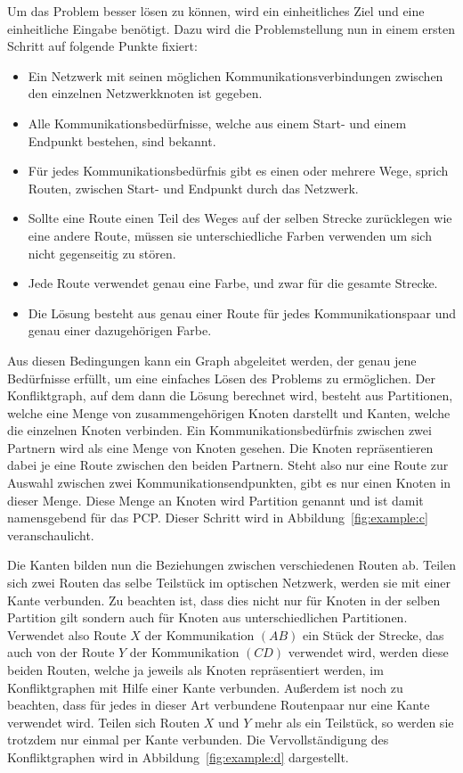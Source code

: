 Um das Problem besser lösen zu können, wird ein einheitliches Ziel und eine einheitliche Eingabe benötigt. Dazu wird die Problemstellung nun in einem ersten Schritt auf folgende Punkte fixiert:
\begin{itemize}
	\item Ein Netzwerk mit seinen möglichen Kommunikationsverbindungen zwischen den einzelnen Netzwerkknoten ist gegeben.
	\item Alle Kommunikationsbedürfnisse, welche aus einem Start- und einem Endpunkt bestehen, sind bekannt.
	\item Für jedes Kommunikationsbedürfnis gibt es einen oder mehrere Wege, sprich Routen, zwischen Start- und Endpunkt durch das Netzwerk.
	\item Sollte eine Route einen Teil des Weges auf der selben Strecke zurücklegen wie eine andere Route, müssen sie unterschiedliche Farben verwenden um sich nicht gegenseitig zu stören.
	\item Jede Route verwendet genau eine Farbe, und zwar für die gesamte Strecke.
	\item Die Lösung besteht aus genau einer Route für jedes Kommunikationspaar und genau einer dazugehörigen Farbe.
\end{itemize}

Aus diesen Bedingungen kann ein Graph abgeleitet werden, der genau jene Bedürfnisse erfüllt, um eine einfaches Lösen des Problems zu ermöglichen. Der Konfliktgraph, auf dem dann die Lösung berechnet wird, besteht aus Partitionen, welche eine Menge von zusammengehörigen Knoten darstellt und Kanten, welche die einzelnen Knoten verbinden. Ein Kommunikationsbedürfnis zwischen zwei Partnern wird als eine Menge von Knoten gesehen. Die Knoten repräsentieren dabei je eine Route zwischen den beiden Partnern. Steht also nur eine Route zur Auswahl zwischen zwei Kommunikationsendpunkten, gibt es nur einen Knoten in dieser Menge. Diese Menge an Knoten wird Partition genannt und ist damit namensgebend für das PCP\@. Dieser Schritt wird in Abbildung~\ref{fig:example:c} veranschaulicht.

Die Kanten bilden nun die Beziehungen zwischen verschiedenen Routen ab. Teilen sich zwei Routen das selbe Teilstück im optischen Netzwerk, werden sie mit einer Kante verbunden. Zu beachten ist, dass dies nicht nur für Knoten in der selben Partition gilt sondern auch für Knoten aus unterschiedlichen Partitionen. Verwendet also Route $X$ der Kommunikation $(AB)$ ein Stück der Strecke, das auch von der Route $Y$ der Kommunikation $(CD)$ verwendet wird, werden diese beiden Routen, welche ja jeweils als Knoten repräsentiert werden, im Konfliktgraphen mit Hilfe einer Kante verbunden. Außerdem ist noch zu beachten, dass für jedes in dieser Art verbundene Routenpaar nur eine Kante verwendet wird. Teilen sich Routen $X$ und $Y$ mehr als ein Teilstück, so werden sie trotzdem nur einmal per Kante verbunden. Die Vervollständigung des Konfliktgraphen wird in Abbildung~\ref{fig:example:d} dargestellt.

